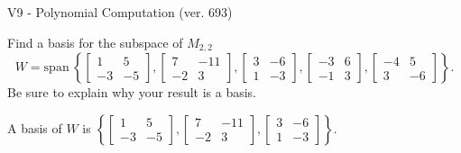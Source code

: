 \begin{exercise}
  \begin{exerciseTitle}V9 - Polynomial Computation (ver. 693)\end{exerciseTitle}
  \begin{exerciseStatement}
    Find a basis for the subspace of \(M_{2,2}\) 
\[W=\mathrm{span}\ \left\{\left[\begin{array}{cc}
1 & 5 \\
-3 & -5
\end{array}\right] , \left[\begin{array}{cc}
7 & -11 \\
-2 & 3
\end{array}\right] , \left[\begin{array}{cc}
3 & -6 \\
1 & -3
\end{array}\right] , \left[\begin{array}{cc}
-3 & 6 \\
-1 & 3
\end{array}\right] , \left[\begin{array}{cc}
-4 & 5 \\
3 & -6
\end{array}\right]\right\}.\]
 Be sure to explain why your result is a basis.


  \end{exerciseStatement}
  \begin{exerciseAnswer}
   A basis of \(W\) is  \(\left\{\left[\begin{array}{cc}
1 & 5 \\
-3 & -5
\end{array}\right] , \left[\begin{array}{cc}
7 & -11 \\
-2 & 3
\end{array}\right] , \left[\begin{array}{cc}
3 & -6 \\
1 & -3
\end{array}\right]\right\}\).
  


  \end{exerciseAnswer}
\end{exercise}